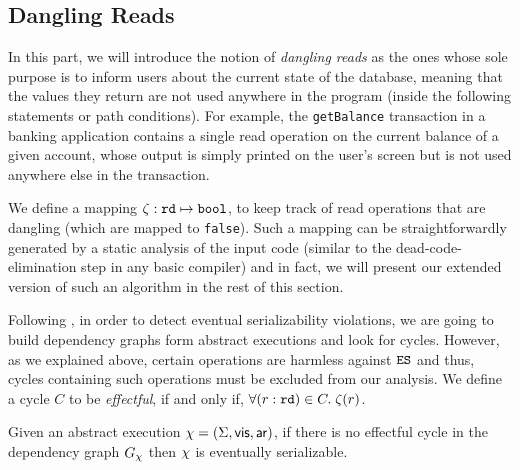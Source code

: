 \documentclass{vldb}
\begin{document}
\subsection {Dangling Reads}
In this part, we will introduce the notion of \emph{dangling reads}
as the ones whose sole purpose is to inform users about the current
state of the database, meaning that the values they return are not used anywhere in
the program (inside the following statements or path conditions). For example,
the \texttt{getBalance} transaction in a banking application contains a
single read operation on
the current balance of a given account, whose output is simply printed on the
user's screen but is not used anywhere else in the transaction.

We define a mapping $\mathtt{\zeta}: \texttt{rd} \mapsto \texttt{bool}$, to keep
track of read operations that are dangling (which are mapped to
\texttt{false}). Such a mapping can be straightforwardly generated by a
static analysis of the input code
(similar to the dead-code-elimination step in any basic compiler) 
and in fact, we will present our
extended version of such an algorithm in the rest of this section.

Following \cite{Nagar:ser}, in order to detect eventual
serializability violations, we are going to build dependency graphs
form abstract executions and look for cycles. However, as we explained
above, certain operations are harmless against $\texttt{ES}$ and thus, cycles
containing such operations must be excluded from our analysis. 
We define a cycle $C$ to be \emph{effectful}, if and only if,
$\forall (r:\texttt{rd}) \in C.\; \zeta(r)$.

\begin{theorem}
  Given an abstract execution $ \chi = (\Sigma,\mathsf{vis},\mathsf{ar})$, if there
  is no effectful cycle in the dependency graph $G_\chi$ then $\chi$ is
  eventually serializable.
\end{theorem}
\end{document}
